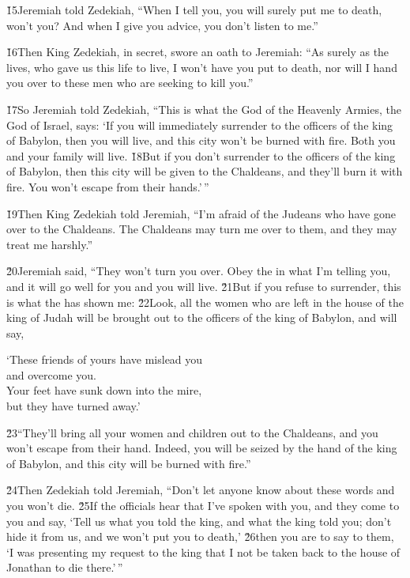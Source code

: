 \v{15}Jeremiah told Zedekiah, ``When I tell you, you will surely put me to death, won't you? And when I give you advice, you don't listen to me.''

\v{16}Then King Zedekiah, in secret, swore an oath to Jeremiah: ``As surely as the  lives, who gave us this life to live, I won't have you put to death, nor will I hand you over to these men who are seeking to kill you.''

\v{17}So Jeremiah told Zedekiah, ``This is what the  God of the Heavenly Armies, the God of Israel, says: `If you will immediately surrender to the officers of the king of Babylon, then you will live, and this city won't be burned with fire. Both you and your family will live. \v{18}But if you don't surrender to the officers of the king of Babylon, then this city will be given to the Chaldeans, and they'll burn it with fire. You won't escape from their hands.'\,''

\v{19}Then King Zedekiah told Jeremiah, ``I'm afraid of the Judeans who have gone over to the Chaldeans. The Chaldeans may turn me over to them, and they may treat me harshly.''

\v{20}Jeremiah said, ``They won't turn you over. Obey the  in what I'm telling you, and it will go well for you and you will live. \v{21}But if you refuse to surrender, this is what the  has shown me: \v{22}Look, all the women who are left in the house of the king of Judah will be brought out to the officers of the king of Babylon, and will say,

\begin{poetry}
\poeml `These friends of yours have mislead you \\
\poemll    and overcome you. \\
\poeml Your feet have sunk down into the mire, \\
\poemll    but they have turned away.'
\end{poetry}

\v{23}``They'll bring all your women and children out to the Chaldeans, and you won't escape from their hand. Indeed, you will be seized by the hand of the king of Babylon, and this city will be burned with fire.''

\v{24}Then Zedekiah told Jeremiah, ``Don't let anyone know about these words and you won't die. \v{25}If the officials hear that I've spoken with you, and they come to you and say, `Tell us what you told the king, and what the king told you; don't hide it from us, and we won't put you to death,' \v{26}then you are to say to them, `I was presenting my request to the king that I not be taken back to the house of Jonathan to die there.'\,''


